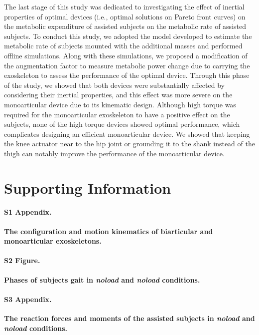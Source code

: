 \documentclass[10pt,letterpaper]{article}
\begin{document}
The last stage of this study was dedicated to investigating the effect of inertial properties of optimal devices (i.e., optimal solutions on Pareto front curves) on the metabolic expenditure of assisted subjects on the metabolic rate of assisted subjects. To conduct this study, we adopted the model developed to estimate the metabolic rate of subjects mounted with the additional masses and performed offline simulations. Along with these simulations, we proposed a modification of the augmentation factor to measure metabolic power change due to carrying the exoskeleton to assess the performance of the optimal device. Through this phase of the study, we showed that both devices were substantially affected by considering their inertial properties, and this effect was more severe on the monoarticular device due to its kinematic design. Although high torque was required for the monoarticular exoskeleton to have a positive effect on the subjects, none of the high torque devices showed optimal performance, which complicates designing an efficient monoarticular device. We showed that keeping the knee actuator near to the hip joint or grounding it to the shank instead of the thigh can notably improve the performance of the monoarticular device.\\
\section*{Supporting Information}

\paragraph*{S1 Appendix.}
\label{S1_Appendix}
{\bf The configuration and motion kinematics of biarticular and monoarticular exoskeletons.}

\paragraph*{S2 Figure.}
\label{S2_Fig}
{\bf Phases of subjects gait in \textit{noload} and \textit{noload} conditions.}

\paragraph*{S3 Appendix.}
\label{S3_Appendix}
{\bf The reaction forces and moments of the assisted subjects in \textit{noload} and \textit{noload} conditions.}
\end{document}
